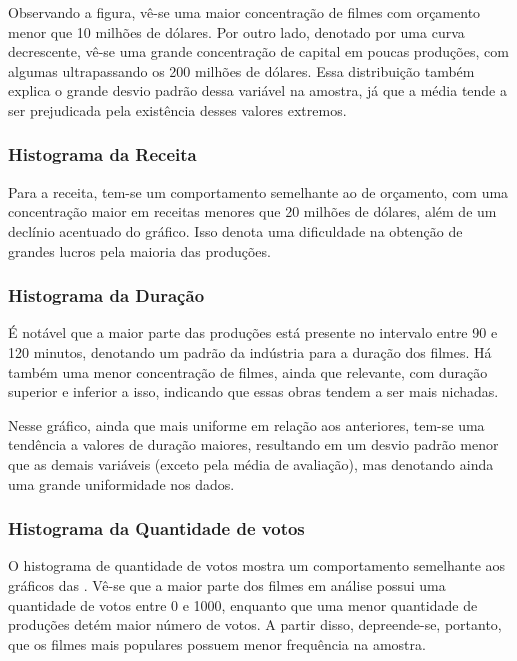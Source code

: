 Observando a figura, vê-se uma maior concentração de filmes com orçamento menor que 10 milhões de dólares. Por outro lado, denotado por uma curva decrescente, vê-se uma grande concentração de capital em poucas produções, com algumas ultrapassando os 200 milhões de dólares. Essa distribuição também explica o grande desvio padrão dessa variável na amostra, já que a média tende a ser prejudicada pela existência desses valores extremos.

\subsubsection{Histograma da Receita}
%
Para a receita, tem-se um comportamento semelhante ao de orçamento, com uma concentração maior em receitas menores que 20 milhões de dólares, além de um declínio acentuado do gráfico. Isso denota uma dificuldade na obtenção de grandes lucros pela maioria das produções.

\subsubsection{Histograma da Duração}
%
É notável que a maior parte das produções está presente no intervalo entre 90 e 120 minutos, denotando um padrão da indústria para a duração dos filmes. Há também uma menor concentração de filmes, ainda que relevante, com duração superior e inferior a isso, indicando que essas obras tendem a ser mais nichadas.

Nesse gráfico, ainda que mais uniforme em relação aos anteriores, tem-se uma tendência a valores de duração maiores, resultando em um desvio padrão menor que as demais variáveis (exceto pela média de avaliação), mas denotando ainda uma grande uniformidade nos dados.

\subsubsection{Histograma da Quantidade de votos}
%

O histograma de quantidade de votos mostra um comportamento semelhante aos gráficos das . Vê-se que a maior parte dos filmes em análise possui uma quantidade de votos entre 0 e 1000, enquanto que uma menor quantidade de produções detém maior número de votos. A partir disso, depreende-se, portanto, que os filmes mais populares possuem menor frequência na amostra.

